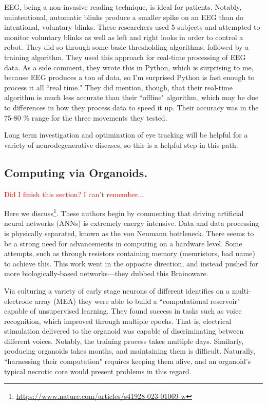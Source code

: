 EEG, being a non-invasive reading technique, is ideal for patients. Notably, unintentional, automatic blinks produce a smaller spike on an EEG than do intentional, voluntary blinks. These researchers used 5 subjects and attempted to monitor voluntary blinks as well as left and right looks in order to control a robot. They did so through some basic thresholding algorithms, followed by a training algorithm. They used this approach for real-time processing of EEG data. As a side comment, they wrote this in Python, which is surprising to me, because EEG produces a ton of data, so I'm surprised Python is fast enough to process it all ``real time." They did mention, though, that their real-time algorithm is much less accurate than their ``offline" algorithm, which may be due to differences in how they process data to speed it up. Their accuracy was in the 75-80 \% range for the three movements they tested.\newline

Long term investigation and optimization of eye tracking will be helpful for a variety of neurodegenerative diseases, so this is a helpful step in this path. 

\subsection{Computing via Organoids.}

\textcolor{red}{Did I finish this section? I can't remember...}

Here we discuss\footnote{\url{https://www.nature.com/articles/s41928-023-01069-w}}. These authors begin by commenting that driving artificial neural networks (ANNs) is extremely energy intensive. Data and data processing is physically separated, known as the von Neumann bottleneck. There seems to be a strong need for advancements in computing on a hardware level. Some attempts, such as through resistors containing memory (memristors, bad name) to achieve this. This work went in the opposite direction, and instead pushed for more biologically-based networks---they dubbed this Brainoware.\newline

Via culturing a variety of early stage neurons of different identifies on a multi-electrode array (MEA) they were able to build a ``computational reservoir" capable of unsupervised learning. They found success in tasks such as voice recognition, which improved through multiple epochs. That is, electrical stimulation delivered to the organoid was capable of discriminating between different voices. Notably, the training process takes multiple days. Similarly, producing organoids takes months, and maintaining them is difficult. Naturally, ``harnessing their computation" requires keeping them alive, and an organoid's typical necrotic core would present problems in this regard. 


